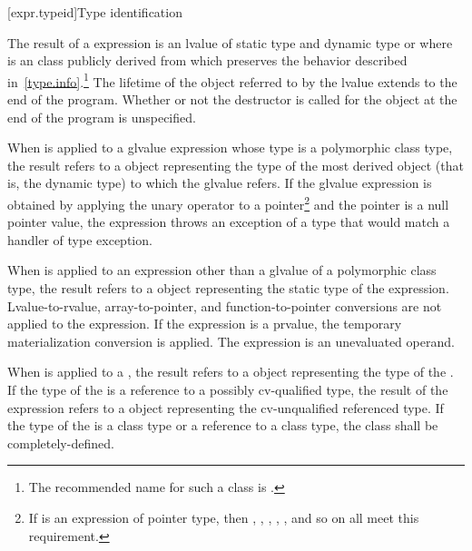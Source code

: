 [expr.typeid]{Type identification}

\pnum
{}%
%
The result of a  expression is an lvalue of static type
%
%
  and dynamic type 
 or   where  is an
 class publicly derived from
 which preserves the behavior described
in~\ref{type.info}.\footnote{The recommended name for such a class is
.}
The lifetime of the object referred to by the lvalue extends to the end
of the program. Whether or not the destructor is called for the
 object at the end of the program is unspecified.

\pnum
When  is applied to a glvalue expression whose type is a
polymorphic class type, the result refers to a
 object representing the type of the most derived
object (that is, the dynamic type) to which the
glvalue refers. If the glvalue expression is obtained by applying the
unary \tcode{*} operator to a pointer\footnote{If  is an expression of
pointer type, then ,
, , , , and so on
all meet this requirement.}
and the pointer is a null pointer value, the
 expression throws an exception of
a type that would match a handler of type
%
%
exception.

\pnum
When  is applied to an expression other than a glvalue of
a polymorphic class type, the result refers to a 
object representing the static type of the expression.
Lvalue-to-rvalue, array-to-pointer,
and function-to-pointer conversions are not applied to
the expression.
If the expression is a prvalue,
the temporary materialization conversion
is applied.
The expression is an unevaluated operand.

\pnum
When  is applied to a , the result
refers to a  object representing the type of the
. If the type of the  is a reference
to a possibly cv-qualified type, the result of the
 expression refers to a  object
representing the cv-unqualified referenced type. If the type of
the  is a class type or a reference to a class type,
the class shall be completely-defined.

